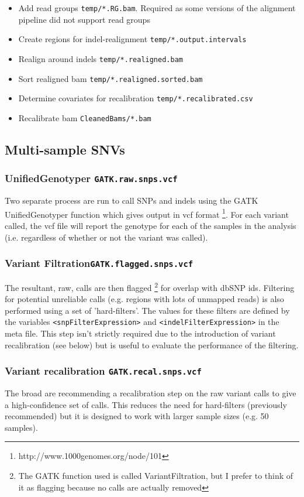 \documentclass[a4paper,11pt]{article}
\begin{document}
\begin{itemize}
 \item Add read groups {\tt temp/*.RG.bam}. Required as some versions of the alignment pipeline did not support read groups
 \item Create regions for indel-realignment {\tt temp/*.output.intervals}
 \item Realign around indels {\tt temp/*.realigned.bam}
 \item Sort realigned bam {\tt temp/*.realigned.sorted.bam}
 \item Determine covariates for recalibration {\tt temp/*.recalibrated.csv}
 \item Recalibrate bam {\tt CleanedBams/*.bam}
\end{itemize}


\subsection{Multi-sample SNVs}

\subsubsection{UnifiedGenotyper {\tt GATK.raw.snps.vcf}}

Two separate process are run to call SNPs and indels using the GATK UnifiedGenotyper function which gives output in vcf format \footnote{http://www.1000genomes.org/node/101}. For each variant called, the vcf file will report the genotype for each of the samples in the analysis (i.e. regardless of whether or not the variant was called). 


\subsubsection{Variant Filtration{\tt GATK.flagged.snps.vcf}}
The resultant, raw, calls are then flagged \footnote{The GATK function used is called VariantFiltration, but I prefer to think of it as flagging because no calls are actually removed} for overlap with dbSNP ids. Filtering for potential unreliable calls (e.g. regions with lots of unmapped reads) is also performed using a set of 'hard-filters'. The values for these filters are defined by the variables {\tt<snpFilterExpression>} and {\tt<indelFilterExpression>} in the meta file. This step isn't strictly required due to the introduction of variant recalibration (see below) but is useful to evaluate the performance of the filtering.

\subsubsection{Variant recalibration {\tt GATK.recal.snps.vcf}}
The broad are recommending a recalibration step on the raw variant calls to give a high-confidence set of calls. This reduces the need for hard-filters (previously recommended) but it is designed to work with larger sample sizes (e.g. 50 samples). 
\end{document}
